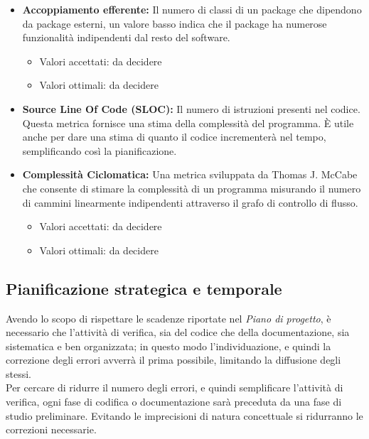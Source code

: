 \documentclass[a4paper]{article}
\begin{document}
\begin{itemize}
					\item \textbf{Accoppiamento efferente:}
						Il numero di classi di un package che dipendono da package esterni, un valore basso indica che il package ha 
						numerose funzionalità indipendenti dal resto del software.
						\begin{itemize}
							\item Valori accettati: da decidere
							\item Valori ottimali: da decidere
						\end{itemize}
						
						
					\item \textbf{Source Line Of Code (SLOC):}
						Il numero di istruzioni presenti nel codice. Questa metrica fornisce una stima della complessità del programma.
						È utile anche per dare una stima di quanto il codice incrementerà nel tempo, semplificando così la
						pianificazione.
					
					\item \textbf{Complessità Ciclomatica:}
						Una metrica sviluppata da Thomas J. McCabe che consente di stimare la complessità di un programma misurando
						il numero di cammini linearmente indipendenti attraverso il grafo di controllo di flusso.
						\begin{itemize}
							\item Valori accettati: da decidere
							\item Valori ottimali: da decidere
						\end{itemize}				
			\end{itemize}
		
		
		\subsection{Pianificazione strategica e temporale}
			Avendo lo scopo di rispettare le scadenze riportate nel \emph{Piano di progetto}, è necessario che l'attività 
			di verifica, sia del codice che della documentazione, sia sistematica e ben organizzata; in questo modo 
			l'individuazione, e quindi la correzione degli errori avverrà il prima possibile, limitando la diffusione 
			degli stessi.\\
			Per cercare di ridurre il numero degli errori, e quindi semplificare l'attività di verifica, ogni fase 
			di codifica o documentazione sarà preceduta da una fase di studio preliminare. Evitando le imprecisioni 
			di natura concettuale si ridurranno le correzioni necessarie.
			
\end{document}
